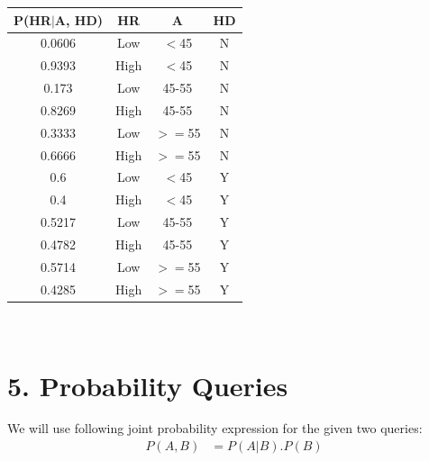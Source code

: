 \documentclass[11pt]{article} %
\begin{document}
\begin{tabular}{|c|c|c|c|}
\hline
P(HR$|$A, HD) & HR   & A      & HD \\ \hline
0.0606        & Low  & $<$45  & N  \\ \hline
0.9393        & High & $<$45  & N  \\ \hline
0.173         & Low  & 45-55 & N  \\ \hline
0.8269        & High & 45-55 & N  \\ \hline
0.3333        & Low  & $>=$55 & N  \\ \hline
0.6666        & High & $>=$55 & N  \\ \hline
0.6           & Low  & $<$45 & Y  \\ \hline
0.4           & High & $<$45 & Y  \\ \hline
0.5217        & Low  & 45-55 & Y  \\ \hline
0.4782        & High & 45-55 & Y  \\ \hline
0.5714        & Low  & $>=$55 & Y  \\ \hline
0.4285        & High & $>=$55 & Y  \\ \hline
\end{tabular}
\vspace*{1em}\\
\section*{5. Probability Queries}
We will use following joint probability expression for the given two queries:
\begin{align*}
P(A,B) &= P(A|B).P(B)
\end{align*}
\end{document}
